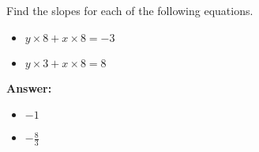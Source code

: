  Find the slopes for each of the following equations. \begin{itemize}\item \( y \times 8 + x \times 8 = -3 \)\item \( y \times 3 + x \times 8 = 8 \)\end{itemize}

        \textbf{Answer:} \begin{itemize}\item \( -1 \)\item \( -\frac{8}{3} \)\end{itemize}
